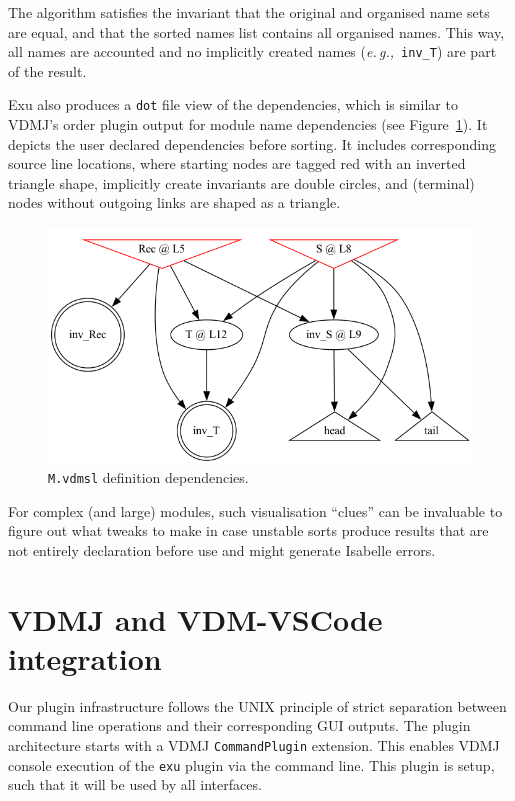 \documentclass[runningheads,a4paper]{llncs}
\newcommand{\eg}{{\em e.\,g.,\/}}
\begin{document}
The algorithm satisfies the invariant that the original and organised name sets are equal, and that the sorted names list contains all organised names. This way, all names are accounted and no implicitly created names (\eg~\verb'inv_T') are part of the result.     

Exu also produces a \texttt{dot} file view of the dependencies, which is similar to VDMJ's order plugin output for module name dependencies (see Figure~\ref{fig:Mdot}). It depicts the user declared dependencies before sorting. It includes corresponding source line locations, where starting nodes are tagged red with an inverted triangle shape, implicitly create invariants are double circles, and (terminal) nodes without outgoing links are shaped as a triangle.  
%
\begin{figure}[htbp]
    \centering
        \includegraphics[width=\textwidth,scale=0.4]{figures/M.png}
    \caption{\texttt{M.vdmsl} definition dependencies.}\label{fig:Mdot}
 \end{figure}
%
For complex (and large) modules, such visualisation ``clues'' can be invaluable to figure out what tweaks to make in case unstable sorts produce results that are not entirely declaration before use and might generate Isabelle errors. 

\section{VDMJ and VDM-VSCode integration}\label{sec:integration}

Our plugin infrastructure follows the UNIX principle of strict separation between command line operations and their corresponding GUI outputs. The plugin architecture starts with a VDMJ \texttt{CommandPlugin} extension. This enables VDMJ console execution of the \texttt{exu} plugin via the command line. This plugin is setup, such that it will be used by all interfaces. 
\end{document}
